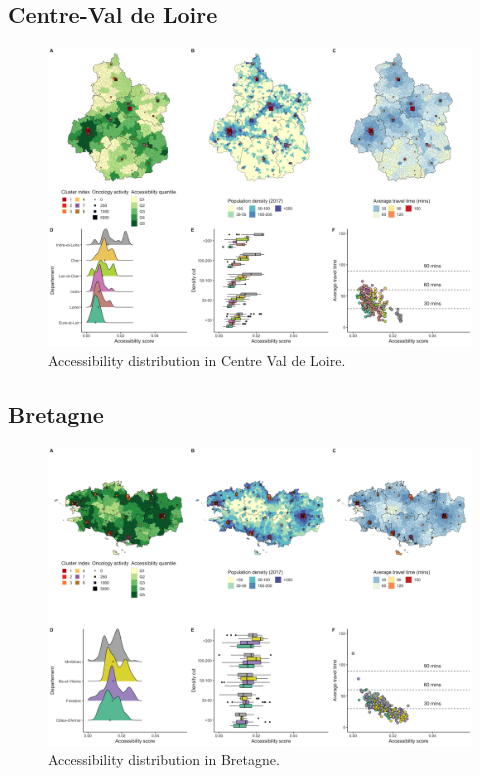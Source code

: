 \subsection*{Centre-Val de Loire}

\begin{figure}[H]
    \includegraphics[width=\textwidth]{images/camion/region_accessibility/accessibility_Centre-Val-de-Loire.png}
    \centering
    \caption{
        Accessibility distribution in Centre Val de Loire.
    }
\end{figure}

\subsection*{Bretagne}

\begin{figure}[H]
    \includegraphics[width=\textwidth]{images/camion/region_accessibility/accessibility_Bretagne.png}
    \centering
    \caption{
        Accessibility distribution in Bretagne.
    }
\end{figure}

